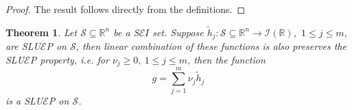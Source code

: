 \documentclass[12pt, reqno]{amsart}
\newtheorem{theorem}{Theorem}[section]
\theoremstyle{definition}
\theoremstyle{remark}
\numberwithin{equation}{section}
\begin{document}
\begin{proof}




 The result follows directly from the definitions.
\end{proof}


    \begin{theorem}
    	Let $ {\mathcal{S}}\subseteq  \mathbb{R}^{n}$ be a S$\mathcal{E}I$ set. Suppose $ \tilde{h}_j: {\mathcal{S}}\subseteq  \mathbb{R}^{n}\rightarrow  \mathcal{I}(\mathbb{R})$,~$1\leq j\leq m$, are  SLU$\mathcal{E}$P  on $ {\mathcal{S}}$, then linear combination of  these functions is also preserves the SLU$\mathcal{E}$P property, i.e. for $\nu_j\geq0,~1\leq j\leq m $, then the function $${g}=\sum\limits_{j=1}^{m}\nu_j  \tilde{h}_j$$ is a SLU$\mathcal{E}$P on ${\mathcal{S}}$.  
    \end{theorem}
    
\end{document}
